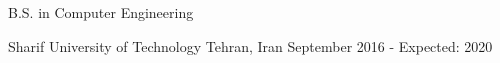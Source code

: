 \begin{cventries}
  \cventry
    {
        \begin{cvitems}
            B.S. in Computer Engineering
        \end{cvitems}
    }
    {Sharif University of Technology}
    {Tehran, Iran}
    {September 2016 - Expected: 2020}
    {}
\end{cventries}
